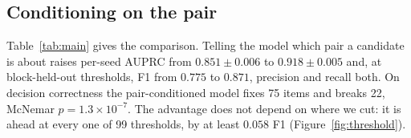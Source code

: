 \documentclass[11pt]{article}
\begin{document}
\begin{table}[t]\centering\small
\setlength{\tabcolsep}{3.4pt}
\caption{Where the gain lives, AUPRC of the three ensembles. Taxa are counted as distinct mentions
found in the passage by TaxoNERD \citep{leguillarme2022taxonerd} (\texttt{en\_ner\_eco\_biobert}); an
argument ``is not a taxon'' when TaxoNERD does not recognise it in the passage. \textsc{Test299}
passages name $5.1$ taxa on average, \textsc{Biotx100} $2.6$ and \textsc{Reject50} $1.7$.}
\label{tab:where}
\end{table}

\subsection{Conditioning on the pair}
\label{sec:res-main}
Table~\ref{tab:main} gives the comparison. Telling the model which pair a candidate is about raises
per-seed AUPRC from $0.851 \pm 0.006$ to $0.918 \pm 0.005$ and, at block-held-out thresholds, F1
from $0.775$ to $0.871$, precision and recall both. On decision correctness the pair-conditioned
model fixes 75 items and breaks 22, McNemar $p = 1.3\times10^{-7}$. The advantage does not depend on
where we cut: it is ahead at every one of 99 thresholds, by at least $0.058$ F1
(Figure~\ref{fig:threshold}).
\end{document}
